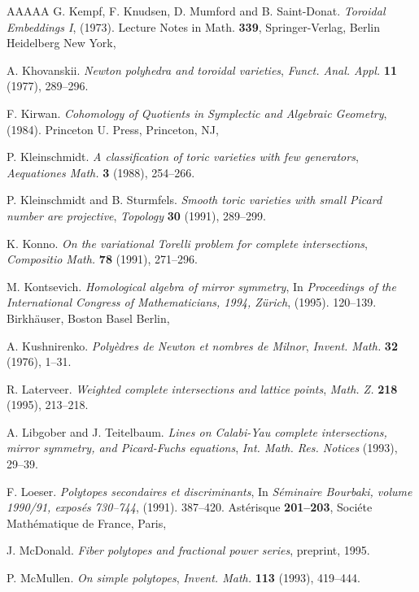 \documentclass{amsart}
\theoremstyle{plain}
\theoremstyle{definition}
\begin{document}
\begin{thebibliography}{AAAAA}
G. Kempf, F. Knudsen, D. Mumford and B. Saint-Donat. \textit{Toroidal Embeddings I}, (1973). Lecture Notes in Math. \textbf{339}, Springer-Verlag, Berlin Heidelberg New York,

A. Khovanskii. \textit{Newton polyhedra and toroidal varieties}, \textit{Funct. Anal. Appl.} \textbf{11} (1977), 289--296.

F. Kirwan. \textit{Cohomology of Quotients in Symplectic and Algebraic Geometry}, (1984). Princeton U. Press, Princeton, NJ,

P. Kleinschmidt. \textit{A classification of toric varieties with few generators}, \textit{Aequationes Math.} \textbf{3} (1988), 254--266.

P. Kleinschmidt and B. Sturmfels. \textit{Smooth toric varieties with small Picard number are projective}, \textit{Topology} \textbf{30} (1991), 289--299.

K. Konno. \textit{On the variational Torelli problem for complete intersections}, \textit{Compositio Math.} \textbf{78} (1991), 271--296.

M. Kontsevich. \textit{Homological algebra of mirror symmetry}, In \textit{Proceedings of the International Congress of Mathematicians, 1994, Z\"urich}, (1995). 120--139. Birkh\"auser, Boston Basel Berlin,

A. Kushnirenko. \textit{Poly\`edres de Newton et nombres de Milnor}, \textit{Invent. Math.} \textbf{32} (1976), 1--31.

R. Laterveer. \textit{Weighted complete intersections and lattice points}, \textit{Math. Z.} \textbf{218} (1995), 213--218.

A. Libgober and J. Teitelbaum. \textit{Lines on Calabi-Yau complete intersections, mirror symmetry, and Picard-Fuchs equations}, \textit{Int. Math. Res. Notices} (1993), 29--39.

F. Loeser. \textit{Polytopes secondaires et discriminants}, In \textit{S\'eminaire Bourbaki, volume 1990/91, expos\'es 730--744}, (1991). 387--420. Ast\'erisque \textbf{201--203}, Soci\'ete Math\'ematique de France, Paris,

J. McDonald. \textit{Fiber polytopes and fractional power series}, preprint, 1995.

P. McMullen. \textit{On simple polytopes}, \textit{Invent. Math.} \textbf{113} (1993), 419--444.


\end{thebibliography}
\end{document}
